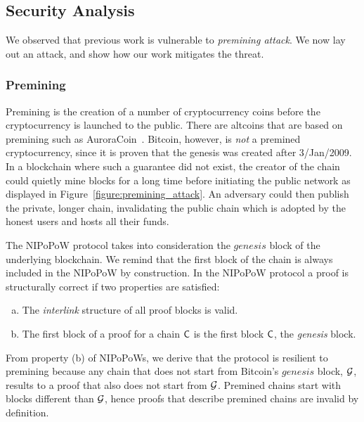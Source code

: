 

\subsection{Security Analysis}

We observed that previous work is vulnerable to \emph{premining attack}. We now
lay out an attack, and show how our work mitigates the threat.
\subsubsection{Premining} Premining is the creation of a number of
cryptocurrency coins before the cryptocurrency is launched to the public. There
are altcoins that are based on premining such as AuroraCoin~\cite{aurora}.
Bitcoin, however, is \emph{not} a premined cryptocurrency, since it is proven
that the genesis was created after 3/Jan/2009. In a blockchain where such a
guarantee did not exist, the creator of the chain could quietly mine blocks for
a long time before initiating the public network as displayed in
Figure~\ref{figure:premining_attack}. An adversary could then publish the
private, longer chain, invalidating the public chain which is adopted by the
honest users and hosts all their funds.



The NIPoPoW protocol takes into consideration the $genesis$ block of the
underlying blockchain. We remind that the first block of the chain is always
included in the NIPoPoW by construction. In the NIPoPoW protocol a proof is
structurally correct if two properties are satisfied:

\begin{enumerate}[(a)]

\item The \emph{interlink} structure of all proof blocks is valid.

\item The first block of a proof for a chain $\mathsf{C}$ is the first block
    $\mathsf{C}$, the \emph{genesis} block.

\end{enumerate}

From property (b) of NIPoPoWs, we derive that the protocol is resilient to
premining because any chain that does not start from Bitcoin's $genesis$ block,
$\mathcal{G}$, results to a proof that also does not start from $\mathcal{G}$. Premined
chains start with blocks different than $\mathcal{G}$, hence proofs that describe
premined chains are invalid by definition.

